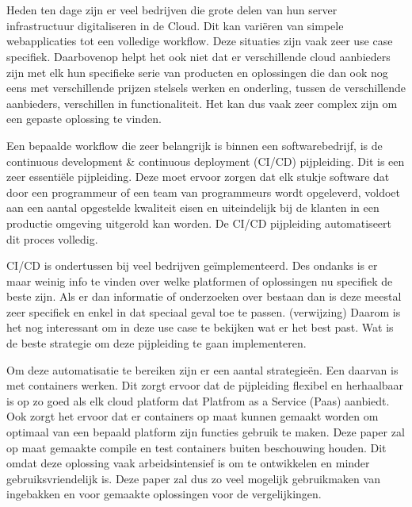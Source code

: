 
\chapter{}
\label{ch:inleiding}
Heden ten dage zijn er veel bedrijven die grote delen van hun server infrastructuur digitaliseren in de Cloud. Dit kan variëren van simpele webapplicaties tot een volledige workflow. Deze situaties zijn vaak zeer use case specifiek. Daarbovenop helpt het ook niet dat er verschillende cloud aanbieders zijn met elk hun specifieke serie van producten en oplossingen die dan ook nog eens met verschillende prijzen stelsels werken en onderling, tussen de verschillende aanbieders, verschillen in functionaliteit. Het kan dus vaak zeer complex zijn om een gepaste oplossing te vinden.

Een bepaalde workflow die zeer belangrijk is binnen een softwarebedrijf, is de continuous development \& continuous deployment (CI/CD) pijpleiding. Dit is een zeer essentiële pijpleiding. Deze moet ervoor zorgen dat elk stukje software dat door een programmeur of een team van programmeurs wordt opgeleverd, voldoet aan een aantal opgestelde kwaliteit eisen en uiteindelijk bij de klanten in een productie omgeving uitgerold kan worden. De CI/CD pijpleiding automatiseert dit proces volledig. 

CI/CD is ondertussen bij veel bedrijven geïmplementeerd. Des ondanks is er maar weinig info te vinden over welke platformen of oplossingen nu specifiek de beste zijn. Als er dan informatie of onderzoeken over bestaan dan is deze meestal zeer specifiek en enkel in dat speciaal geval toe te passen. (verwijzing) Daarom is het nog interessant om in deze use case te bekijken wat er het best past. Wat is de beste strategie om deze pijpleiding te gaan implementeren.

Om deze automatisatie te bereiken zijn er een aantal strategieën. Een daarvan is met containers werken. Dit zorgt ervoor dat de pijpleiding flexibel en herhaalbaar is op zo goed als elk cloud platform dat Platfrom as a Service (Paas) aanbiedt. Ook zorgt het ervoor dat er containers op maat kunnen gemaakt worden om optimaal van een bepaald platform zijn functies gebruik te maken. Deze paper zal op maat gemaakte compile en test containers buiten beschouwing houden. Dit omdat deze oplossing vaak arbeidsintensief is om te ontwikkelen en minder gebruiksvriendelijk is. Deze paper zal dus zo veel mogelijk gebruikmaken van ingebakken en voor gemaakte oplossingen voor de vergelijkingen.

